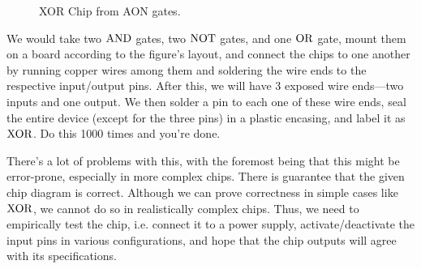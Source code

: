   \begin{figure}[H]
    \centering 
    \caption{XOR Chip from AON gates.} 
    \label{fig:xor_from_aon}
  \end{figure}

  We would take two $\AND$ gates, two $\NOT$ gates, and one $\OR$ gate, mount them on a board according to the figure's layout, and connect the chips to one another by running copper wires among them and soldering the wire ends to the respective input/output pins. After this, we will have 3 exposed wire ends---two inputs and one output. We then solder a pin to each one of these wire ends, seal the entire device (except for the three pins) in a plastic encasing, and label it as $\XOR$. Do this 1000 times and you're done. 

  There's a lot of problems with this, with the foremost being that this might be error-prone, especially in more complex chips. There is guarantee that the given chip diagram is correct. Although we can prove correctness in simple cases like $\XOR$, we cannot do so in realistically complex chips. Thus, we need to empirically test the chip, i.e. connect it to a power supply, activate/deactivate the input pins in various configurations, and hope that the chip outputs will agree with its specifications. 

